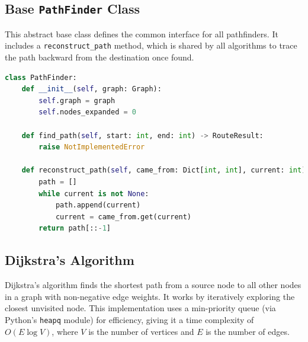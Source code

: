 \documentclass[12pt, a4paper]{report}
\begin{document}
\subsection{Base \texttt{PathFinder} Class}
This abstract base class defines the common interface for all pathfinders. It includes a \texttt{reconstruct\_path} method, which is shared by all algorithms to trace the path backward from the destination once found.
\begin{lstlisting}[language=Python, caption={Base `PathFinder` Class}, label={lst:pathfinder_base}]
class PathFinder:
    def __init__(self, graph: Graph):
        self.graph = graph
        self.nodes_expanded = 0
        
    def find_path(self, start: int, end: int) -> RouteResult:
        raise NotImplementedError
        
    def reconstruct_path(self, came_from: Dict[int, int], current: int) -> List[int]:
        path = []
        while current is not None:
            path.append(current)
            current = came_from.get(current)
        return path[::-1]
\end{lstlisting}

\subsection{Dijkstra's Algorithm}
Dijkstra's algorithm finds the shortest path from a source node to all other nodes in a graph with non-negative edge weights. It works by iteratively exploring the closest unvisited node. This implementation uses a min-priority queue (via Python's \texttt{heapq} module) for efficiency, giving it a time complexity of $O(E \log V)$, where $V$ is the number of vertices and $E$ is the number of edges.
\end{document}
